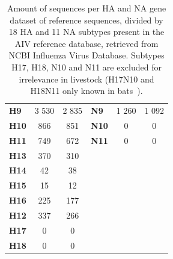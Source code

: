 \begin{table}[ht!]
\begin{tabular}{@{}lcclcc@{}}
	\textbf{H9}  & 3 530        & 2 835        & \textbf{N9}  & 1 260        & 1 092        \\
	\textbf{H10} & 866          & 851          & \textbf{N10} & 0            & 0            \\
	\textbf{H11} & 749          & 672          & \textbf{N11} & 0            & 0            \\
	\textbf{H13} & 370          & 310          &              &              &              \\
	\textbf{H14} & 42           & 38           &              &              &              \\
	\textbf{H15} & 15           & 12           &              &              &              \\
	\textbf{H16} & 225          & 177          &              &              &              \\
	\textbf{H12} & 337          & 266          &              &              &              \\
	\textbf{H17} & 0            & 0            &              &              &              \\
	\textbf{H18} & 0            & 0            &              &              &              \\ \hline
	\end{tabular}
	\caption[AIV reference collection by HA and NA subtypes.]{Amount of sequences per HA and NA gene dataset of reference sequences, divided by 18 HA and 11 NA subtypes present in the AIV reference database, retrieved from NCBI Influenza Virus Database. Subtypes H17, H18, N10 and N11 are excluded for irrelevance in livestock (H17N10 and H18N11 only known in bats~\cite{tong2013new}).}
\label{tab:apx-aiv-ref-subtypes}
\end{table}


